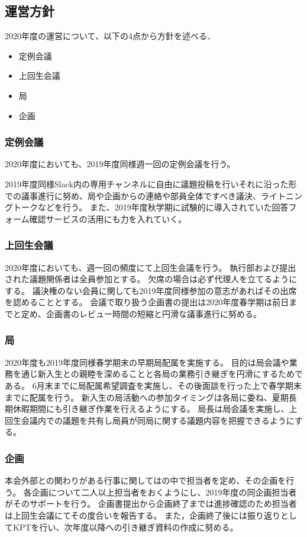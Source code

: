 \subsection*{運営方針}


2020年度の運営について、以下の4点から方針を述べる．
\begin{itemize}
    \item 定例会議
    \item 上回生会議
    \item 局
    \item 企画
\end{itemize}

\subsubsection*{定例会議}
2020年度においても、2019年度同様週一回の定例会議を行う。

2019年度同様Slack内の専用チャンネルに自由に議題投稿を行いそれに沿った形での議事進行に努め、局や企画からの連絡や部員全体ですべき議決、ライトニングトークなどを行う。
また、2019年度秋学期に試験的に導入されていた回答フォーム確認サービスの活用にも力を入れていく。


\subsubsection*{上回生会議}
2020年度においても、週一回の頻度にて上回生会議を行う。
執行部および提出された議題関係者は全員参加とする。
欠席の場合は必ず代理人を立てるようにする。
議決権のない会員に関しても2019年度同様参加の意志があればその出席を認めることとする。
会議で取り扱う企画書の提出は2020年度春学期は前日までと定め、企画書のレビュー時間の短縮と円滑な議事進行に努める。

\subsubsection*{局}
2020年度も2019年度同様春学期末の早期局配属を実施する。
目的は局会議や業務を通じ新入生との親睦を深めることと各局の業務引き継ぎを円滑にするためである。
6月末までに局配属希望調査を実施し、その後面談を行った上で春学期末までに配属を行う。
新入生の局活動への参加タイミングは各局に委ね、夏期長期休暇期間にも引き継ぎ作業を行えるようにする。
局長は局会議を実施し、上回生会議内での議題を共有し局員が同局に関する議題内容を把握できるようにする。


\subsubsection*{企画}
本会外部との関わりがある行事に関しては\secondGrade{}の中で担当者を定め、その企画を行う。
各企画について二人以上担当者をおくようにし、2019年度の同企画担当者がそのサポートを行う。
企画書提出から企画終了までは進捗確認のため担当者は上回生会議にてその度合いを報告する。
また，企画終了後には振り返りとしてKPTを行い、次年度以降への引き継ぎ資料の作成に努める。
